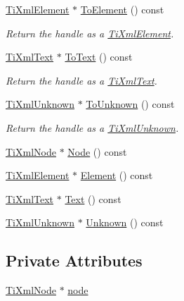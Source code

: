 \begin{DoxyCompactItemize}
\hyperlink{classTiXmlElement}{TiXmlElement} $\ast$ \hyperlink{classTiXmlHandle_abc6e7ed383a5fe1e52b0c0004b457b9e}{ToElement} () const 
\begin{DoxyCompactList}\small\item\em Return the handle as a \hyperlink{classTiXmlElement}{TiXmlElement}. \item\end{DoxyCompactList}\item 
\hyperlink{classTiXmlText}{TiXmlText} $\ast$ \hyperlink{classTiXmlHandle_a4ac53a652296203a5b5e13854d923586}{ToText} () const 
\begin{DoxyCompactList}\small\item\em Return the handle as a \hyperlink{classTiXmlText}{TiXmlText}. \item\end{DoxyCompactList}\item 
\hyperlink{classTiXmlUnknown}{TiXmlUnknown} $\ast$ \hyperlink{classTiXmlHandle_a1381c17507a130767b1e23afc93b3674}{ToUnknown} () const 
\begin{DoxyCompactList}\small\item\em Return the handle as a \hyperlink{classTiXmlUnknown}{TiXmlUnknown}. \item\end{DoxyCompactList}\item 
\hyperlink{classTiXmlNode}{TiXmlNode} $\ast$ \hyperlink{classTiXmlHandle_ab44b723a8dc9af72838a303c079d0376}{Node} () const 
\item 
\hyperlink{classTiXmlElement}{TiXmlElement} $\ast$ \hyperlink{classTiXmlHandle_acb5fe8388a526289ea65e817a51e05e7}{Element} () const 
\item 
\hyperlink{classTiXmlText}{TiXmlText} $\ast$ \hyperlink{classTiXmlHandle_a9fc739c8a18d160006f82572fc143d13}{Text} () const 
\item 
\hyperlink{classTiXmlUnknown}{TiXmlUnknown} $\ast$ \hyperlink{classTiXmlHandle_a49675b74357ba2aae124657a9a1ef465}{Unknown} () const 
\end{DoxyCompactItemize}
\subsection*{Private Attributes}
\begin{DoxyCompactItemize}
\item 
\hyperlink{classTiXmlNode}{TiXmlNode} $\ast$ \hyperlink{classTiXmlHandle_ac5429de14bb78b16288bac5bf33c6858}{node}
\end{DoxyCompactItemize}


